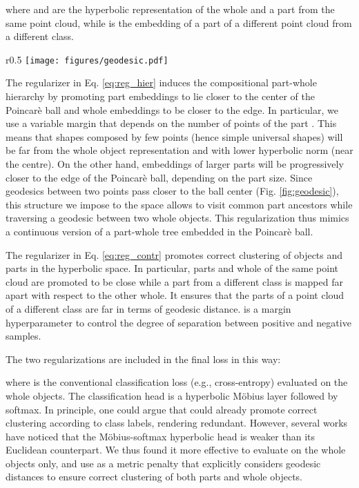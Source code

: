 \documentclass{article}
\begin{document}
where  and  are the hyperbolic representation of the whole and a part from the same point cloud, while  is the embedding of a part of a different point cloud from a different class. 

\begin{wrapfigure}{r}{0.5\textwidth}
   \centering
   \texttt{[image: figures/geodesic.pdf]}
   \caption{Geodesic path.}
   \label{fig:geodesic}
\end{wrapfigure}

The  regularizer in Eq. \eqref{eq:reg_hier} induces the compositional part-whole hierarchy by promoting part embeddings to lie closer to the center of the Poincarè ball and whole embeddings to be closer to the edge. In particular, we use a variable margin  that depends on the number of points  of the part . This means that shapes composed by few points (hence simple universal shapes) will be far from the whole object representation and with lower hyperbolic norm (near the centre). On the other hand, embeddings of larger parts will be progressively closer to the edge of the Poincarè ball, depending on the part size. Since geodesics between two points pass closer to the ball center (Fig. \ref{fig:geodesic}), this structure we impose to the space allows to visit common part ancestors while traversing a geodesic between two whole objects. This regularization thus mimics a continuous version of a part-whole tree embedded in the Poincarè ball.

The  regularizer in Eq. \eqref{eq:reg_contr} promotes correct clustering of objects and parts in the hyperbolic space. In particular, parts and whole of the same point cloud are promoted to be close while a part from a different class is mapped far apart with respect to the other whole.
It ensures that the parts of a point cloud of a different class are far in terms of geodesic distance.  is a margin hyperparameter to control the degree of separation between positive and negative samples. 


The two regularizations are included in the final loss in this way:

where  is the conventional classification loss (e.g., cross-entropy) evaluated on the whole objects. The classification head is a hyperbolic M\"{o}bius layer followed by softmax. In principle, one could argue that  could already promote correct clustering according to class labels, rendering  redundant. However, several works \cite{ganea2018hyperbolic} have noticed that the M\"{o}bius-softmax hyperbolic head is weaker than its Euclidean counterpart. We thus found it more effective to evaluate  on the whole objects only, and use  as a metric penalty that explicitly considers geodesic distances to ensure correct clustering of both parts and whole objects.
\end{document}
